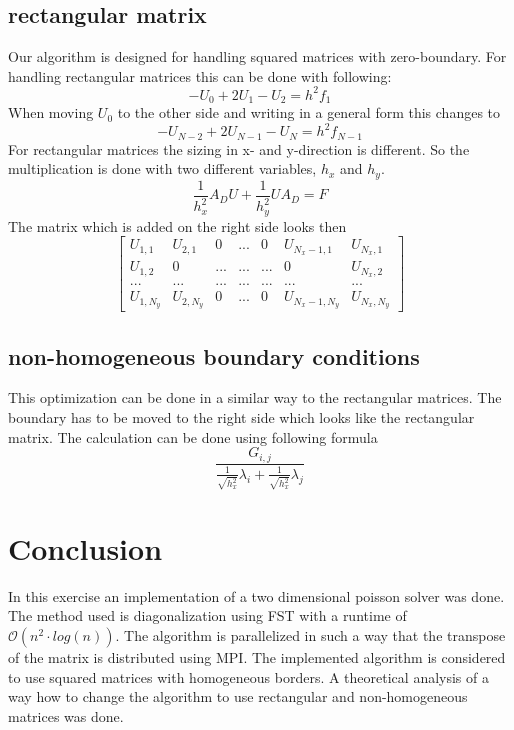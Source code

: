 \documentclass{article}
\begin{document}
\subsection{rectangular matrix}
Our algorithm is designed for handling squared matrices with zero-boundary. For handling rectangular matrices this can be done with following:
\begin{equation}
-U_0+2U_1-U_2=h^2f_1
\end{equation}
When moving $U_0$ to the other side and writing in a general form this changes to
\begin{equation}
-U_{N-2}+2U_{N-1}-U_N=h^2f_{N-1}
\end{equation}
For rectangular matrices the sizing in x- and y-direction is different. So the multiplication is done with two different variables, $h_x$ and $h_y$.
\begin{equation}
\frac{1}{h_x^2}A_DU+\frac{1}{h_y^2}UA_D=F
\end{equation}
The matrix which is added on the right side looks then
$$
\begin{bmatrix}
U_{1,1} & U_{2,1} & 0 & ... & 0 & U_{N_x-1,1} & U_{N_x,1} \\
U_{1,2} & 0 & ... & ... & ... & 0 & U_{N_x,2} \\
... & ... & ... & ... &... & ... & ... \\
U_{1,N_y} & U_{2,N_y} & 0 & ... & 0 & U_{N_x-1,N_y} & U_{N_x,N_y} 
\end{bmatrix}
$$
\subsection{non-homogeneous boundary conditions}
This optimization can be done in a similar way to the rectangular matrices. The boundary has to be moved to the right side which looks like the rectangular matrix. The calculation can be done using following formula
\begin{equation}
\frac{G_{i,j}}{\frac{1}{\sqrt{h_x^2}}\lambda_i+\frac{1}{\sqrt{h_x^2}}\lambda_j}
\end{equation}
\newpage
\section{Conclusion}
In this exercise an implementation of a two dimensional poisson solver was done. The method used is diagonalization using FST with a runtime of $\mathcal{O}(n^2\cdot log(n))$. The algorithm is parallelized in such a way that the transpose of the matrix is distributed using MPI. The implemented algorithm is considered to use squared matrices with homogeneous borders. A theoretical analysis of a way how to change the algorithm to use rectangular and non-homogeneous matrices was done.
\end{document}
